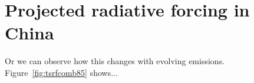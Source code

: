 \section{Projected radiative forcing in China}



Or we can observe how this changes with evolving emissions. Figure~\ref{fig:tsrfcomb85} shows...